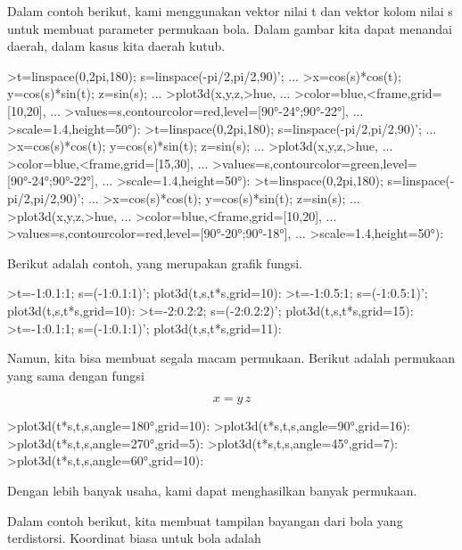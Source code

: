 \documentclass{article}
\begin{document}
\begin{eulernotebook}
\begin{eulercomment}
\begin{eulercomment}
\begin{eulercomment}
Dalam contoh berikut, kami menggunakan vektor nilai t dan vektor kolom
nilai s untuk membuat parameter permukaan bola. Dalam gambar kita
dapat menandai daerah, dalam kasus kita daerah kutub.
\end{eulercomment}
\begin{eulerprompt}
>t=linspace(0,2pi,180); s=linspace(-pi/2,pi/2,90)'; ...
>x=cos(s)*cos(t); y=cos(s)*sin(t); z=sin(s); ...
>plot3d(x,y,z,>hue, ...
>color=blue,<frame,grid=[10,20], ...
>values=s,contourcolor=red,level=[90°-24°;90°-22°], ...
>scale=1.4,height=50°):
>t=linspace(0,2pi,180); s=linspace(-pi/2,pi/2,90)'; ...
>x=cos(s)*cos(t); y=cos(s)*sin(t); z=sin(s); ...
>plot3d(x,y,z,>hue, ...
>color=blue,<frame,grid=[15,30], ...
>values=s,contourcolor=green,level=[90°-24°;90°-22°], ...
>scale=1.4,height=50°):
>t=linspace(0,2pi,180); s=linspace(-pi/2,pi/2,90)'; ...
>x=cos(s)*cos(t); y=cos(s)*sin(t); z=sin(s); ...
>plot3d(x,y,z,>hue, ...
>color=blue,<frame,grid=[10,20], ...
>values=s,contourcolor=red,level=[90°-20°;90°-18°], ...
>scale=1.4,height=50°):
\end{eulerprompt}
\begin{eulercomment}
Berikut adalah contoh, yang merupakan grafik fungsi.
\end{eulercomment}
\begin{eulerprompt}
>t=-1:0.1:1; s=(-1:0.1:1)'; plot3d(t,s,t*s,grid=10):
>t=-1:0.5:1; s=(-1:0.5:1)'; plot3d(t,s,t*s,grid=10):
>t=-2:0.2:2; s=(-2:0.2:2)'; plot3d(t,s,t*s,grid=15):
>t=-1:0.1:1; s=(-1:0.1:1)'; plot3d(t,s,t*s,grid=11):
\end{eulerprompt}
\begin{eulercomment}
Namun, kita bisa membuat segala macam permukaan. Berikut adalah
permukaan yang sama dengan fungsi

\end{eulercomment}
\begin{eulerformula}
\[
x = y \, z
\]
\end{eulerformula}
\begin{eulerprompt}
>plot3d(t*s,t,s,angle=180°,grid=10):
>plot3d(t*s,t,s,angle=90°,grid=16):
>plot3d(t*s,t,s,angle=270°,grid=5):
>plot3d(t*s,t,s,angle=45°,grid=7):
>plot3d(t*s,t,s,angle=60°,grid=10):
\end{eulerprompt}
\begin{eulercomment}
Dengan lebih banyak usaha, kami dapat menghasilkan banyak permukaan.

Dalam contoh berikut, kita membuat tampilan bayangan dari bola yang
terdistorsi. Koordinat biasa untuk bola adalah


\end{eulercomment}
\end{eulercomment}
\end{eulercomment}
\end{eulernotebook}
\end{document}

